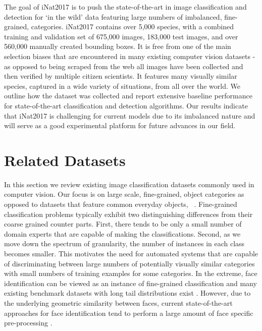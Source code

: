 \documentclass[10pt,twocolumn,letterpaper]{article}
\begin{document}
The goal of iNat2017 is to push the state-of-the-art in image classification and detection for `in the wild' data featuring large numbers of imbalanced, fine-grained, categories.
iNat2017 contains over 5,000 species, with a combined training and validation set of 675,000 images, 183,000 test images, and over 560,000 manually created bounding boxes.
It is free from one of the main selection biases that are encountered in many existing computer vision datasets - as opposed to being scraped from the web all images have been collected and then verified by multiple citizen scientists. 
It features many visually similar species, captured in a wide variety of situations, from all over the world. 
We outline how the dataset was collected and report extensive baseline performance for state-of-the-art classification and detection algorithms.
Our results indicate that iNat2017 is challenging for current models due to its imbalanced nature and will serve as a good experimental platform for future advances in our field.


\section{Related Datasets}
In this section we review existing image classification datasets commonly used in computer vision. 
Our focus is on large scale, fine-grained, object categories as opposed to datasets that feature common everyday objects, \eg~\cite{fei2007learning, everingham2010pascal, lin2014microsoft}.
Fine-grained classification problems typically exhibit two distinguishing differences from their coarse grained counter parts. First, there tends to be only a small number of domain experts that are capable of making the classifications. Second, as we move down the spectrum of granularity, the number of instances in each class becomes smaller. 
This motivates the need for automated systems that are capable of discriminating between large numbers of potentially visually similar categories with small numbers of training examples for some categories. 
In the extreme, face identification can be viewed as an instance of fine-grained classification and many existing benchmark datasets with long tail distributions exist \eg \cite{LFWTech, parkhi2015deep, guo2016ms, cao2017vggface2}. 
However, due to the underlying geometric similarity between faces, current state-of-the-art approaches for face identification tend to perform a large amount of face specific pre-processing \cite{taigman2014deepface, schroff2015facenet, parkhi2015deep}.
\end{document}
